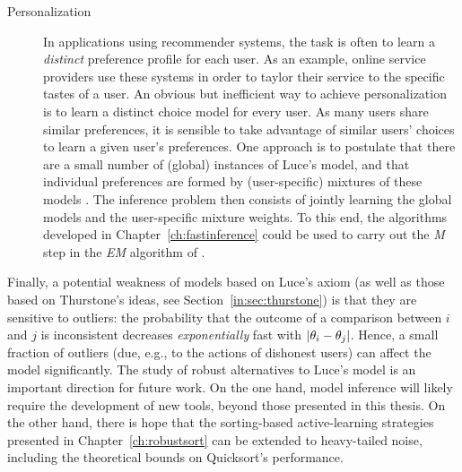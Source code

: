 \begin{description}
\item[Personalization] In applications using recommender systems, the task is often to learn a \emph{distinct} preference profile for each user.
As an example, online service providers use these systems in order to taylor their service to the specific tastes of a user.
An obvious but inefficient way to achieve personalization is to learn a distinct choice model for every user.
As many users share similar preferences, it is sensible to take advantage of similar users' choices to learn a given user's preferences.
One approach is to postulate that there are a small number of (global) instances of Luce's model, and that individual preferences are formed by (user-specific) mixtures of these models \citep{gormley2008exploring, ammar2015ranked}.
The inference problem then consists of jointly learning the global models and the user-specific mixture weights.
To this end, the algorithms developed in Chapter~\ref{ch:fastinference} could be used to carry out the \emph{M} step in the \emph{EM} algorithm of \citet{gormley2008exploring}.
\end{description}

Finally, a potential weakness of models based on Luce's axiom (as well as those based on Thurstone's ideas, see Section~\ref{in:sec:thurstone}) is that they are sensitive to outliers: the probability that the outcome of a comparison between $i$ and $j$ is inconsistent decreases \emph{exponentially} fast with $\lvert\theta_i - \theta_j\rvert$.
Hence, a small fraction of outliers (due, e.g., to the actions of dishonest users) can affect the model significantly.
The study of robust alternatives to Luce's model is an important direction for future work.
On the one hand, model inference will likely require the development of new tools, beyond those presented in this thesis.
On the other hand, there is hope that the sorting-based active-learning strategies presented in Chapter~\ref{ch:robustsort} can be extended to heavy-tailed noise, including the theoretical bounds on Quicksort's performance.
